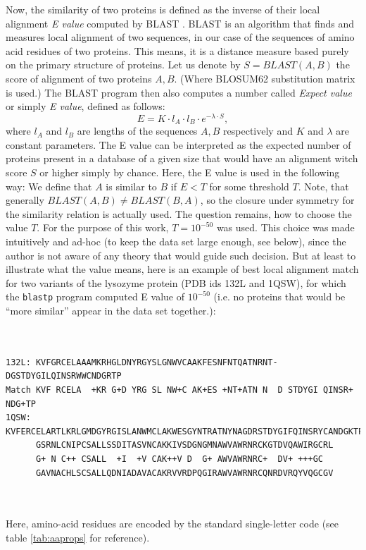 \documentclass[11pt,twoside,a4paper]{book}
\begin{document}
Now, the similarity of two proteins is defined as the inverse of their local alignment \emph{E value} computed by BLAST \cite{blast} \cite{blastp}.
BLAST is an algorithm that finds and measures local alignment of two sequences,
in our case of the sequences of amino acid residues of two proteins. 
This means, it is a distance measure based purely on the primary structure of proteins.
Let us denote by $S = BLAST(A,B)$ the score of alignment 
of two proteins $A, B$. (Where BLOSUM62 substitution matrix is used.) 
The BLAST program then also computes a number called \emph{Expect value} or simply \emph{E value}, 
defined as follows:
\[ E = K \cdot l_A \cdot l_B \cdot e^{-\lambda \cdot S}, \]
where $l_A$ and $l_B$ are lengths of the sequences $A,B$ respectively and $K$ and $\lambda$ are constant parameters.
The E value can be interpreted as the expected number of proteins present in a database of a given size
that would have an alignment witch score $S$ or higher simply by chance.
Here, the E value is used in the following way: We define that $A$ is similar to $B$ if $E < T$ for some threshold $T$.
Note, that generally $BLAST(A,B) \neq BLAST(B,A)$,
so the closure under symmetry for the similarity relation is actually used.
The question remains, how to choose the value $T$.
For the purpose of this work, $T = 10^{-50}$ was used.
This choice was made intuitively and ad-hoc (to keep the data set large enough, see below),
since the author is not aware of any theory that would guide such decision.
But at least to illustrate what the value means, here is an example of best local alignment match
for two variants of the lysozyme protein (PDB ids 132L and 1QSW), for which the \texttt{blastp} program computed E value of $10^{-50}$
(i.e. no proteins that would be ``more similar'' appear in the data set together.):
\begin{minipage}{\linewidth}
\begin{verbatim}


132L: KVFGRCELAAAMKRHGLDNYRGYSLGNWVCAAKFESNFNTQATNRNT-DGSTDYGILQINSRWWCNDGRTP
Match KVF RCELA  +KR G+D YRG SL NW+C AK+ES +NT+ATN N  D STDYGI QINSR+  NDG+TP
1QSW: KVFERCELARTLKRLGMDGYRGISLANWMCLAKWESGYNTRATNYNAGDRSTDYGIFQINSRYCANDGKTP
      GSRNLCNIPCSALLSSDITASVNCAKKIVSDGNGMNAWVAWRNRCKGTDVQAWIRGCRL
      G+ N C++ CSALL  +I  +V CAK++V D  G+ AWVAWRNRC+  DV+ +++GC
      GAVNACHLSCSALLQDNIADAVACAKRVVRDPQGIRAWVAWRNRCQNRDVRQYVQGCGV
      
      
\end{verbatim}
\end{minipage}
Here, amino-acid residues are encoded by the standard single-letter code (see table \ref{tab:aaprops} for reference). 
\end{document}
